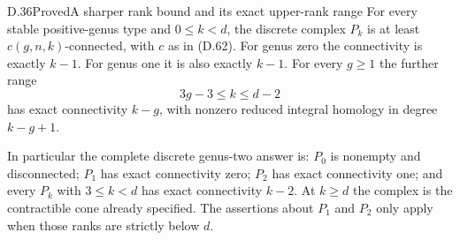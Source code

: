 \begin{result}{D.36}{Proved}{A sharper rank bound and its exact upper-rank range}
For every stable positive-genus type and $0\leq k<d$,
the discrete complex $P_k$ is at least
$c(g,n,k)$-connected, with $c$ as in (D.62).
For genus zero the connectivity is exactly $k-1$.
For genus one it is also exactly $k-1$.
For every $g\geq1$ the further range
\[
                 3g-3\leq k\leq d-2                         \tag{D.66}
\]
has exact connectivity $k-g$, with nonzero reduced integral
homology in degree $k-g+1$.

In particular the complete discrete genus-two answer is:
$P_0$ is nonempty and disconnected; $P_1$ has exact
connectivity zero; $P_2$ has exact connectivity one;
and every $P_k$ with $3\leq k<d$ has exact connectivity
$k-2$.  At $k\geq d$ the complex is the contractible cone
already specified.  The assertions about $P_1$ and $P_2$
only apply when those ranks are strictly below $d$.
\end{result}
